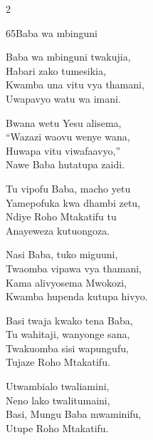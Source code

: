\documentclass{article}
\begin{document}
\begin{multicols}{2}
\begin{hymn}{65}{Baba wa mbinguni}{}
\begin{stanza}
Baba wa mbinguni twakujia,\\
Habari zako tumesikia,\\
Kwamba una vitu vya thamani,\\
Uwapavyo watu wa imani.
\end{stanza}
\begin{stanza}
Bwana wetu Yesu alisema,\\
``Wazazi waovu wenye wana,\\
Huwapa vitu viwafaavyo,''\\
Nawe Baba hutatupa zaidi.
\end{stanza}
\begin{stanza}
Tu vipofu Baba, macho yetu\\
Yamepofuka kwa dhambi zetu,\\
Ndiye Roho Mtakatifu tu\\
Anayeweza kutuongoza.
\end{stanza}
\begin{stanza}
Nasi Baba, tuko miguuni,\\
Twaomba vipawa vya thamani,\\
Kama alivyosema Mwokozi,\\
Kwamba hupenda kutupa hivyo.
\end{stanza}
\begin{stanza}
Basi twaja kwako tena Baba,\\
Tu wahitaji, wanyonge sana,\\
Twakuomba sisi wapungufu,\\
Tujaze Roho Mtakatifu.
\end{stanza}
\begin{stanza}
Utwambialo twaliamini,\\
Neno lako twalitumaini,\\
Basi, Mungu Baba mwaminifu,\\
Utupe Roho Mtakatifu.
\end{stanza}
\end{hymn}


\end{multicols}
\end{document}

